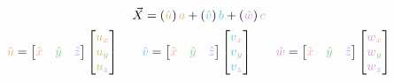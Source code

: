 \documentclass[preview]{standalone}
\begin{document}
$$\vec{X} = \left(\textcolor[HTML]{d4b76b}{\hat{u}}\right)\textcolor[HTML]{d4b76b}{a} + \left(\textcolor[HTML]{58c4d5}{\hat{v}}\right)\textcolor[HTML]{58c4d5}{b} + \left(\textcolor[HTML]{ce93ca}{\hat{w}}\right)\textcolor[HTML]{ce93ca}{c}$$
$$\begin{align*}
\textcolor[HTML]{d4b76b}{\hat{u}} = \begin{bmatrix}\textcolor[HTML]{f9a598}{\hat{x}}&\textcolor[HTML]{87c993}{\hat{y}}&\textcolor[HTML]{94acef}{\hat{z}}\end{bmatrix}\begin{bmatrix}\textcolor[HTML]{d4b76b}{u}_{\textcolor[HTML]{f9a598}{x}}\\\textcolor[HTML]{d4b76b}{u}_{\textcolor[HTML]{87c993}{y}}\\\textcolor[HTML]{d4b76b}{u}_{\textcolor[HTML]{94acef}{z}}\end{bmatrix}
&\quad&
\textcolor[HTML]{58c4d5}{\hat{v}} = \begin{bmatrix}\textcolor[HTML]{f9a598}{\hat{x}}&\textcolor[HTML]{87c993}{\hat{y}}&\textcolor[HTML]{94acef}{\hat{z}}\end{bmatrix}\begin{bmatrix}\textcolor[HTML]{58c4d5}{v}_{\textcolor[HTML]{f9a598}{x}}\\\textcolor[HTML]{58c4d5}{v}_{\textcolor[HTML]{87c993}{y}}\\\textcolor[HTML]{58c4d5}{v}_{\textcolor[HTML]{94acef}{z}}\end{bmatrix}
&\quad&
\textcolor[HTML]{ce93ca}{\hat{w}} = \begin{bmatrix}\textcolor[HTML]{f9a598}{\hat{x}}&\textcolor[HTML]{87c993}{\hat{y}}&\textcolor[HTML]{94acef}{\hat{z}}\end{bmatrix}\begin{bmatrix}\textcolor[HTML]{ce93ca}{w}_{\textcolor[HTML]{f9a598}{x}}\\\textcolor[HTML]{ce93ca}{w}_{\textcolor[HTML]{87c993}{y}}\\\textcolor[HTML]{ce93ca}{w}_{\textcolor[HTML]{94acef}{z}}\end{bmatrix}
\end{align*}$$
\end{document}
